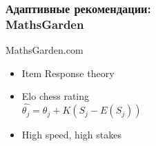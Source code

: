\documentclass{beamer}
\begin{document}
\begin{frame}\frametitle{Адаптивные рекомендации: \\MathsGarden}

    \bigskip
    MathsGarden.com
    
    \begin{itemize}
        \item Item Response theory
        \item Elo chess rating \\$\hat{\theta_j} = \theta_j + K(S_j - E(S_j))$
        \item High speed, high stakes
    \end{itemize}
    
    \begin{figure}[t]
      \centering
      \hfill
      
    \end{figure}
    
\end{frame}
\end{document}

